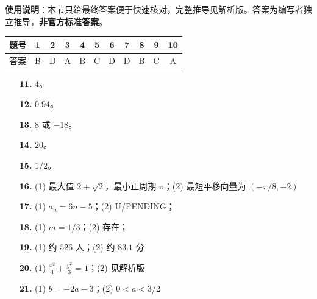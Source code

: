 
\begin{gknotice}
\textbf{使用说明}：本节只给最终答案便于快速核对，完整推导见解析版。答案为编写者独立推导，\textbf{非官方标准答案}。
\end{gknotice}

\begin{center}\begin{tabular}{ccccccccccc}
\toprule
题号 & 1 & 2 & 3 & 4 & 5 & 6 & 7 & 8 & 9 & 10 \\
\midrule
答案 & B & D & A & B & C & D & D & B & C & A \\
\bottomrule
\end{tabular}\end{center}

\begin{itemize}[leftmargin=2.6em]
  \item[\textbf{11.}] $4$。
  \item[\textbf{12.}] $0.94$。
  \item[\textbf{13.}] $8$ 或 $-18$。
  \item[\textbf{14.}] $20$。
  \item[\textbf{15.}] $1/2$。
  \item[\textbf{16.}] (1) 最大值 $2+\sqrt2$，最小正周期 $\pi$；(2) 最短平移向量为 $(-\pi/8,-2)$
\end{itemize}

\begin{itemize}[leftmargin=2.6em]
  \item[\textbf{17.}] (1) $a_n=6n-5$；(2) U/PENDING；
  \item[\textbf{18.}] (1) $m=1/3$；(2) 存在；
  \item[\textbf{19.}] (1) 约 $526$ 人；(2) 约 $83.1$ 分
  \item[\textbf{20.}] (1) $\frac{x^2}{4}+\frac{y^2}{3}=1$；(2) 见解析版
  \item[\textbf{21.}] (1) $b=-2a-3$；(2) $0<a<3/2$
\end{itemize}
